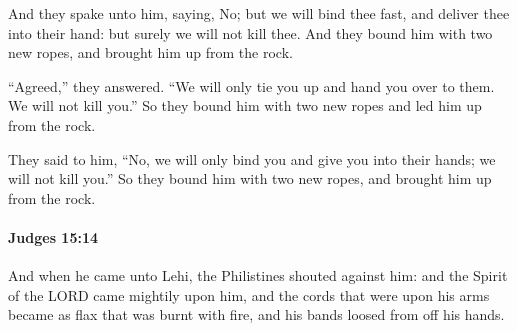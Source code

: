 			\begin{versebox}
					\item[BHS] 
					\item[ASV] And they spake unto him, saying, No; but we will bind thee fast, and deliver thee into their hand: but surely we will not kill thee. And they bound him with two new ropes, and brought him up from the rock.
					\item[NIV] “Agreed,” they answered. “We will only tie you up and hand you over to them. We will not kill you.” So they bound him with two new ropes and led him up from the rock.
					\item[NRSV] They said to him, “No, we will only bind you and give you into their hands; we will not kill you.” So they bound him with two new ropes, and brought him up from the rock.
			\end{versebox}

		\paragraph{Judges 15:14} %
			\label{JUDGES-15-14}

			And when he came unto Lehi, the Philistines shouted against him: and the Spirit of the LORD came mightily upon him, and the cords that were upon his arms became as flax that was burnt with fire, and his bands loosed from off his hands.

